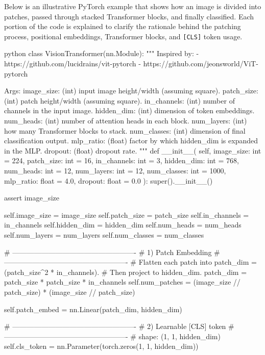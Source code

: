 \noindent
Below is an illustrative PyTorch example that shows how an image is divided into patches, passed through stacked Transformer blocks, and finally classified. Each portion of the code is explained to clarify the rationale behind the patching process, positional embeddings, Transformer blocks, and \texttt{[CLS]} token usage.

\begin{mintedbox}{python}
class VisionTransformer(nn.Module):
    """
    Inspired by:
    - https://github.com/lucidrains/vit-pytorch
    - https://github.com/jeonsworld/ViT-pytorch
    
    Args:
    image_size: (int) input image height/width (assuming square).
    patch_size: (int) patch height/width (assuming square).
    in_channels: (int) number of channels in the input image.
    hidden_dim: (int) dimension of token embeddings.
    num_heads: (int) number of attention heads in each block.
    num_layers: (int) how many Transformer blocks to stack.
    num_classes: (int) dimension of final classification output.
    mlp_ratio: (float) factor by which hidden_dim is expanded in the MLP.
    dropout: (float) dropout rate.
    """
    def __init__(
    self,
    image_size: int = 224,
    patch_size: int = 16,
    in_channels: int = 3,
    hidden_dim: int = 768,
    num_heads: int = 12,
    num_layers: int = 12,
    num_classes: int = 1000,
    mlp_ratio: float = 4.0,
    dropout: float = 0.0
    ):
        super().__init__()
        
        assert image_size %
        
        self.image_size = image_size
        self.patch_size = patch_size
        self.in_channels = in_channels
        self.hidden_dim = hidden_dim
        self.num_heads = num_heads
        self.num_layers = num_layers
        self.num_classes = num_classes
        
        # ----------------------------------------------------
        # 1) Patch Embedding
        # ----------------------------------------------------
        # Flatten each patch into patch_dim = (patch_size^2 * in_channels).
        # Then project to hidden_dim.
        patch_dim = patch_size * patch_size * in_channels
        self.num_patches = (image_size // patch_size) * (image_size // patch_size)
        
        self.patch_embed = nn.Linear(patch_dim, hidden_dim)
        
        # ----------------------------------------------------
        # 2) Learnable [CLS] token
        # ----------------------------------------------------
        # shape: (1, 1, hidden_dim)
        self.cls_token = nn.Parameter(torch.zeros(1, 1, hidden_dim))
        

\end{mintedbox}
